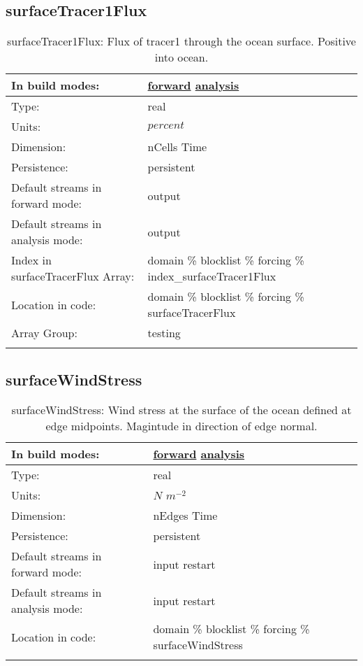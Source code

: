 \subsection[surfaceTracer1Flux]{surfaceTracer1Flux}
\label{subsec:var_sec_forcing_surfaceTracer1Flux}
\begin{center}
\begin{longtable}{| p{2.0in} | p{4.0in} |}
        \hline 
        In build modes: & \hyperref[subsec:forward_var_tab_forcing]{forward} \hyperref[subsec:analysis_var_tab_forcing]{analysis} \\
        \hline 
        Type: & real \\
        \hline 
        Units: & $percent$ \\
        \hline 
        Dimension: & nCells Time \\
        \hline 
        Persistence: & persistent \\
        \hline 
		 Default streams in forward mode: &  output \\
        \hline 
		 Default streams in analysis mode: &  output \\
        \hline 
		 Index in surfaceTracerFlux Array: & domain \% blocklist \% forcing \% index\_surfaceTracer1Flux \\
		 \hline 
		 Location in code: & domain \% blocklist \% forcing \% surfaceTracerFlux \\
		 \hline 
		 Array Group: & testing \\
		 \hline 
    \caption{surfaceTracer1Flux: Flux of tracer1 through the ocean surface. Positive into ocean.}
\end{longtable}
\end{center}
\subsection[surfaceWindStress]{surfaceWindStress}
\label{subsec:var_sec_forcing_surfaceWindStress}
\begin{center}
\begin{longtable}{| p{2.0in} | p{4.0in} |}
        \hline 
        In build modes: & \hyperref[subsec:forward_var_tab_forcing]{forward} \hyperref[subsec:analysis_var_tab_forcing]{analysis} \\
        \hline 
        Type: & real \\
        \hline 
        Units: & $N$ $m^{-2}$ \\
        \hline 
        Dimension: & nEdges Time \\
        \hline 
        Persistence: & persistent \\
        \hline 
		 Default streams in forward mode: &  input restart \\
        \hline 
		 Default streams in analysis mode: &  input restart \\
        \hline 
		 Location in code: & domain \% blocklist \% forcing \% surfaceWindStress \\
		 \hline 
    \caption{surfaceWindStress: Wind stress at the surface of the ocean defined at edge midpoints. Magintude in direction of edge normal.}
\end{longtable}
\end{center}
